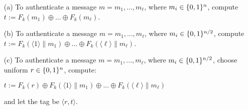 \begin{questions}
        \begin{enumerate}
            \item[(a)] To authenticate a message $m=m_1,...,m_\ell$, where $m_i\in\{{0,1}\}^n$, compute $t:=F_k(m_1)\oplus{...}\oplus{F_k}(m_\ell)$.
            \item[(b)] To authenticate a message $m=m_1,...,m_\ell$, where $m_i\in\{{0,1}\}^{n/2}$, compute $t:=F_k(\langle{1}\rangle\parallel{m_1})\oplus{...}\oplus{F_k}(\langle\ell\rangle\parallel{m_\ell})$.
            \item[(c)] To authenticate a message $m=m_1,...,m_\ell$, where $m_i\in\{{0,1}\}^{n/2}$, choose uniform $r\in\{{0,1}\}^n$, compute:
                \begin{center}
                    $t:=F_k(r)\oplus{F_k}(\langle{1}\rangle\parallel{m_1})\oplus{...}\oplus{F_k}(\langle\ell\rangle\parallel{m_\ell})$
                \end{center}
                and let the tag be $\langle{r,t}\rangle$.
        \end{enumerate}


\end{questions}
